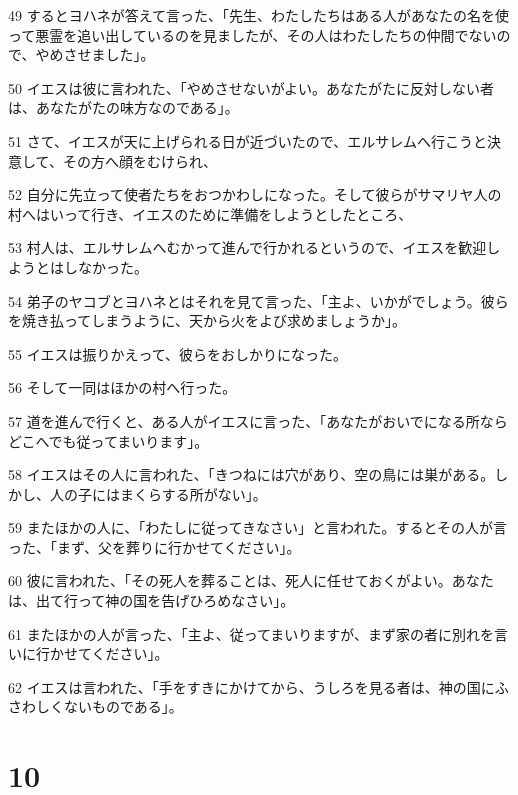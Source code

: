 \par 49 するとヨハネが答えて言った、「先生、わたしたちはある人があなたの名を使って悪霊を追い出しているのを見ましたが、その人はわたしたちの仲間でないので、やめさせました」。
\par 50 イエスは彼に言われた、「やめさせないがよい。あなたがたに反対しない者は、あなたがたの味方なのである」。
\par 51 さて、イエスが天に上げられる日が近づいたので、エルサレムへ行こうと決意して、その方へ顔をむけられ、
\par 52 自分に先立って使者たちをおつかわしになった。そして彼らがサマリヤ人の村へはいって行き、イエスのために準備をしようとしたところ、
\par 53 村人は、エルサレムへむかって進んで行かれるというので、イエスを歓迎しようとはしなかった。
\par 54 弟子のヤコブとヨハネとはそれを見て言った、「主よ、いかがでしょう。彼らを焼き払ってしまうように、天から火をよび求めましょうか」。
\par 55 イエスは振りかえって、彼らをおしかりになった。
\par 56 そして一同はほかの村へ行った。
\par 57 道を進んで行くと、ある人がイエスに言った、「あなたがおいでになる所ならどこへでも従ってまいります」。
\par 58 イエスはその人に言われた、「きつねには穴があり、空の鳥には巣がある。しかし、人の子にはまくらする所がない」。
\par 59 またほかの人に、「わたしに従ってきなさい」と言われた。するとその人が言った、「まず、父を葬りに行かせてください」。
\par 60 彼に言われた、「その死人を葬ることは、死人に任せておくがよい。あなたは、出て行って神の国を告げひろめなさい」。
\par 61 またほかの人が言った、「主よ、従ってまいりますが、まず家の者に別れを言いに行かせてください」。
\par 62 イエスは言われた、「手をすきにかけてから、うしろを見る者は、神の国にふさわしくないものである」。

\chapter{10}

